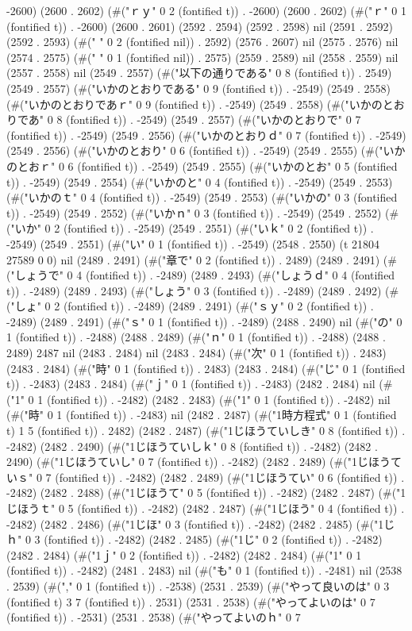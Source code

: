 -2600) (2600 . 2602) (#("ｒｙ" 0 2 (fontified t)) . -2600) (2600 . 2602) (#("ｒ" 0 1 (fontified t)) . -2600) (2600 . 2601) (2592 . 2594) (2592 . 2598) nil (2591 . 2592) (2592 . 2593) (#("  " 0 2 (fontified nil)) . 2592) (2576 . 2607) nil (2575 . 2576) nil (2574 . 2575) (#(" " 0 1 (fontified nil)) . 2575) (2559 . 2589) nil (2558 . 2559) nil (2557 . 2558) nil (2549 . 2557) (#("以下の通りである" 0 8 (fontified t)) . 2549) (2549 . 2557) (#("いかのとおりである" 0 9 (fontified t)) . -2549) (2549 . 2558) (#("いかのとおりであｒ" 0 9 (fontified t)) . -2549) (2549 . 2558) (#("いかのとおりであ" 0 8 (fontified t)) . -2549) (2549 . 2557) (#("いかのとおりで" 0 7 (fontified t)) . -2549) (2549 . 2556) (#("いかのとおりｄ" 0 7 (fontified t)) . -2549) (2549 . 2556) (#("いかのとおり" 0 6 (fontified t)) . -2549) (2549 . 2555) (#("いかのとおｒ" 0 6 (fontified t)) . -2549) (2549 . 2555) (#("いかのとお" 0 5 (fontified t)) . -2549) (2549 . 2554) (#("いかのと" 0 4 (fontified t)) . -2549) (2549 . 2553) (#("いかのｔ" 0 4 (fontified t)) . -2549) (2549 . 2553) (#("いかの" 0 3 (fontified t)) . -2549) (2549 . 2552) (#("いかｎ" 0 3 (fontified t)) . -2549) (2549 . 2552) (#("いか" 0 2 (fontified t)) . -2549) (2549 . 2551) (#("いｋ" 0 2 (fontified t)) . -2549) (2549 . 2551) (#("い" 0 1 (fontified t)) . -2549) (2548 . 2550) (t 21804 27589 0 0) nil (2489 . 2491) (#("章で" 0 2 (fontified t)) . 2489) (2489 . 2491) (#("しょうで" 0 4 (fontified t)) . -2489) (2489 . 2493) (#("しょうｄ" 0 4 (fontified t)) . -2489) (2489 . 2493) (#("しょう" 0 3 (fontified t)) . -2489) (2489 . 2492) (#("しょ" 0 2 (fontified t)) . -2489) (2489 . 2491) (#("ｓｙ" 0 2 (fontified t)) . -2489) (2489 . 2491) (#("ｓ" 0 1 (fontified t)) . -2489) (2488 . 2490) nil (#("の" 0 1 (fontified t)) . -2488) (2488 . 2489) (#("ｎ" 0 1 (fontified t)) . -2488) (2488 . 2489) 2487 nil (2483 . 2484) nil (2483 . 2484) (#("次" 0 1 (fontified t)) . 2483) (2483 . 2484) (#("時" 0 1 (fontified t)) . 2483) (2483 . 2484) (#("じ" 0 1 (fontified t)) . -2483) (2483 . 2484) (#("ｊ" 0 1 (fontified t)) . -2483) (2482 . 2484) nil (#("1" 0 1 (fontified t)) . -2482) (2482 . 2483) (#("1" 0 1 (fontified t)) . -2482) nil (#("時" 0 1 (fontified t)) . -2483) nil (2482 . 2487) (#("1時方程式" 0 1 (fontified t) 1 5 (fontified t)) . 2482) (2482 . 2487) (#("1じほうていしき" 0 8 (fontified t)) . -2482) (2482 . 2490) (#("1じほうていしｋ" 0 8 (fontified t)) . -2482) (2482 . 2490) (#("1じほうていし" 0 7 (fontified t)) . -2482) (2482 . 2489) (#("1じほうていｓ" 0 7 (fontified t)) . -2482) (2482 . 2489) (#("1じほうてい" 0 6 (fontified t)) . -2482) (2482 . 2488) (#("1じほうて" 0 5 (fontified t)) . -2482) (2482 . 2487) (#("1じほうｔ" 0 5 (fontified t)) . -2482) (2482 . 2487) (#("1じほう" 0 4 (fontified t)) . -2482) (2482 . 2486) (#("1じほ" 0 3 (fontified t)) . -2482) (2482 . 2485) (#("1じｈ" 0 3 (fontified t)) . -2482) (2482 . 2485) (#("1じ" 0 2 (fontified t)) . -2482) (2482 . 2484) (#("1ｊ" 0 2 (fontified t)) . -2482) (2482 . 2484) (#("1" 0 1 (fontified t)) . -2482) (2481 . 2483) nil (#("も" 0 1 (fontified t)) . -2481) nil (2538 . 2539) (#("," 0 1 (fontified t)) . -2538) (2531 . 2539) (#("やって良いのは" 0 3 (fontified t) 3 7 (fontified t)) . 2531) (2531 . 2538) (#("やってよいのは" 0 7 (fontified t)) . -2531) (2531 . 2538) (#("やってよいのｈ" 0 7 